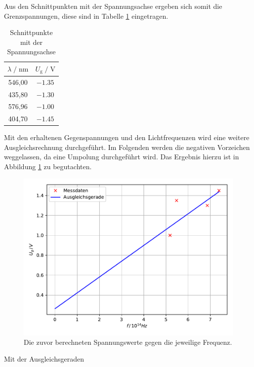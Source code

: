 Aus den Schnittpunkten mit der Spannungsachse ergeben sich somit die Grenzspannungen, 
diese sind in Tabelle \ref{tab:gegen} eingetragen. 

\begin{table}
    \centering
    \caption{Schnittpunkte mit der Spannungsachse}
    \label{tab:gegen}
    \begin{tabular}{c c}
    \toprule
    $ \lambda \;/\; \si{\nano\meter} $ & $U_\text{g} \;/\; \si{\volt}$\\
    \midrule 
      546,00 & $\num{-1.35}$\\ %
      435,80 & $\num{-1.30}$\\ %
      576,96 & $\num{-1.00}$\\ %
      404,70 & $\num{-1.45}$\\ %
    \bottomrule
    \end{tabular}
\end{table}

Mit den erhaltenen Gegenspannungen und den Lichtfrequenzen wird eine weitere Ausgleichsrechnung 
durchgeführt. Im Folgenden werden die negativen Vorzeichen weggelassen, da eine Umpolung durchgeführt
wird. Das Ergebnis hierzu ist in Abbildung \ref{fig:plot2} zu begutachten. 

\begin{figure}
  \centering
  \includegraphics{content/plot5.pdf}
  \caption{Die zuvor berechneten Spannungswerte gegen die jeweilige Frequenz.}
  \label{fig:plot2}
\end{figure}

Mit der Ausgleichsgeraden

